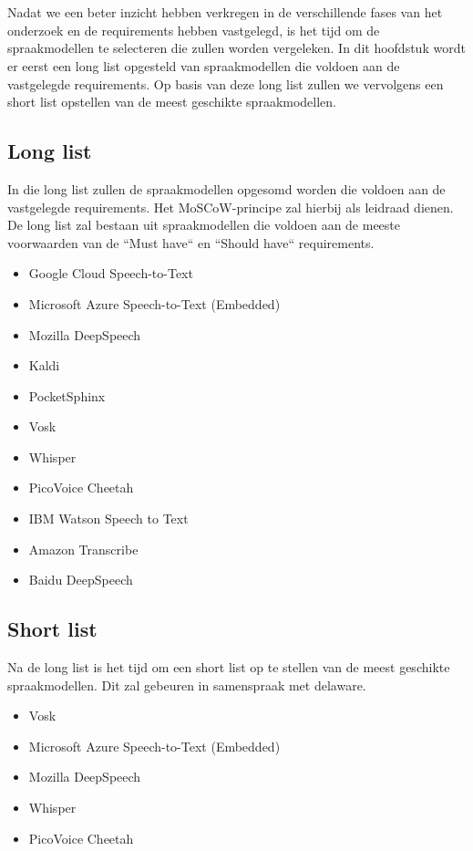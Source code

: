 
\chapter{}%
\label{ch:Selectie van spraakmodellen}

Nadat we een beter inzicht hebben verkregen in de verschillende fases van het onderzoek en de requirements hebben vastgelegd, is het tijd om de spraakmodellen te selecteren die zullen worden vergeleken. In dit hoofdstuk wordt er eerst een long list opgesteld van spraakmodellen die voldoen aan de vastgelegde requirements. Op basis van deze long list zullen we vervolgens een short list opstellen van de meest geschikte spraakmodellen.

\section{Long list}
In die long list zullen de spraakmodellen opgesomd worden die voldoen aan de vastgelegde requirements. Het MoSCoW-principe zal hierbij als leidraad dienen. De long list zal bestaan uit spraakmodellen die voldoen aan de meeste voorwaarden van de ``Must have`` en ``Should have`` requirements.

\begin{itemize}
  \item Google Cloud Speech-to-Text
  \item Microsoft Azure Speech-to-Text (Embedded)
  \item Mozilla DeepSpeech
  \item Kaldi
  \item PocketSphinx
  \item Vosk
  \item Whisper
  \item PicoVoice Cheetah
  \item IBM Watson Speech to Text
  \item Amazon Transcribe
  \item Baidu DeepSpeech
\end{itemize}

\section{Short list}
Na de long list is het tijd om een short list op te stellen van de meest geschikte spraakmodellen. Dit zal gebeuren in samenspraak met delaware.

\begin{itemize}
  \item Vosk
  \item Microsoft Azure Speech-to-Text (Embedded)
  \item Mozilla DeepSpeech
  \item Whisper
  \item PicoVoice Cheetah
\end{itemize}